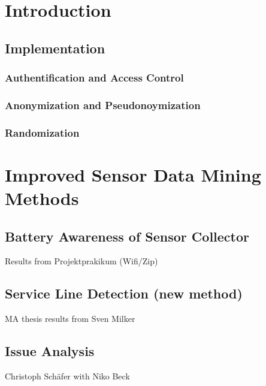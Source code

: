 \documentclass[external]{20120615_deliverable_template_ukob}
\theoremstyle{definition}
\begin{document}

\setcounter{tocdepth}{2}

\LGTOC

\newpage
\newcommand{\todo}[2]{\textcolor{magenta}{#1: #2}}

\chapter{Introduction}
\label{chap:Introduction}



\clearpage

\section{Implementation}
\subsection{Authentification and Access Control}
\subsection{Anonymization and Pseudonoymization}
\subsection{Randomization}

\chapter{Improved Sensor Data Mining Methods}
\section{Battery Awareness of Sensor Collector}
Results from Projektprakikum (Wifi/Zip)

\section{Service Line Detection (new method)}
MA thesis results from Sven Milker

\section{Issue Analysis}
Christoph Schäfer with Niko Beck


\end{document}
